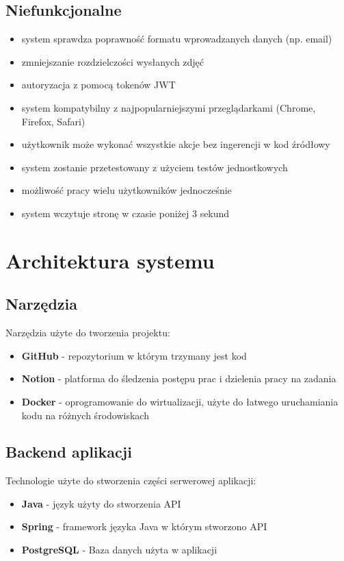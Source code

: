 \documentclass[12pt]{article}
\begin{document}
\subsection{Niefunkcjonalne}
\begin{itemize}
\item system sprawdza poprawność formatu wprowadzanych danych (np. email)
\item zmniejszanie rozdzielczości wysłanych zdjęć
\item autoryzacja z pomocą tokenów JWT
\item system kompatybilny z najpopularniejszymi przeglądarkami (Chrome, Firefox, Safari)
\item użytkownik może wykonać wszystkie akcje bez ingerencji w kod źródłowy
\item system zostanie przetestowany z użyciem testów jednostkowych
\item możliwość pracy wielu użytkowników jednocześnie
\item system wczytuje stronę w czasie poniżej 3 sekund

\end{itemize}

\newpage
\section{Architektura systemu}
\subsection{Narzędzia}
Narzędzia użyte do tworzenia projektu:
\begin{itemize}
\item \textbf{GitHub} - repozytorium w którym trzymany jest kod
\item \textbf{Notion} - platforma do śledzenia postępu prac i dzielenia pracy na zadania
\item \textbf{Docker} - oprogramowanie do wirtualizacji, użyte do łatwego uruchamiania kodu na różnych środowiskach
\end{itemize}
\subsection{Backend aplikacji}
Technologie użyte do stworzenia części serwerowej aplikacji:
\begin{itemize}
\item \textbf{Java} - język użyty do stworzenia API
\item \textbf{Spring} - framework języka Java w którym stworzono API
\item \textbf{PostgreSQL} - Baza danych użyta w aplikacji

\end{itemize}
\end{document}
